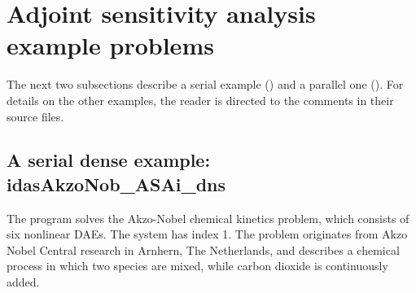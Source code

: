 \section{Adjoint sensitivity analysis example problems}\label{s:adj_examples}

The next two subsections describe a serial example () and
a parallel one ().
For details on the other examples, the reader is directed to the comments in their
source files.

\subsection{A serial dense example: idasAkzoNob\_ASAi\_dns}\label{ss:idasAkzoNob_ASAi_dns}

The  program solves the Akzo-Nobel chemical kinetics
problem, which consists of six nonlinear DAEs.  The system has index 1.
The problem originates from Akzo Nobel Central research in Arnhern,
The Netherlands, and describes a chemical process in which two species
are mixed, while carbon dioxide is continuously added.

